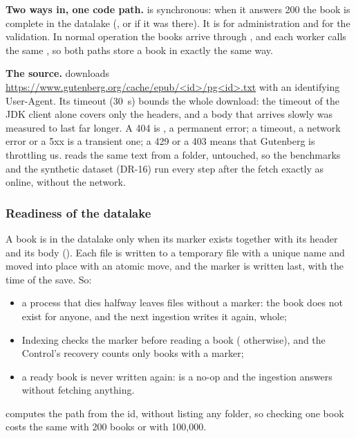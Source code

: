 \textbf{Two ways in, one code path.}  is synchronous: when it answers 200 the book is
complete in the datalake (, or  if it was there). It is for administration
and for the validation. In normal operation the books arrive through , and each worker calls the
same , so both paths store a book in exactly the same way.

\textbf{The source.}  downloads \url{https://www.gutenberg.org/cache/epub/<id>/pg<id>.txt}
with an identifying User-Agent. Its timeout (30~s) bounds the whole download: the timeout of the JDK client alone
covers only the headers, and a body that arrives slowly was measured to last far longer. A 404 is
, a permanent error; a timeout, a network error or a 5xx is a transient one; a 429 or a 403 means that
Gutenberg is throttling us.  reads the same text from a folder, untouched, so the benchmarks and
the synthetic dataset (DR-16) run every step after the fetch exactly as online, without the network.

\subsubsection{Readiness of the datalake}
\label{sec:readiness}

A book is in the datalake only when its  marker exists together with its header and its body
(). Each file is written to a temporary file with a unique name and moved
into place with an atomic move, and the marker is written last, with the time of the save. So:
\begin{itemize}
  \item a process that dies halfway leaves files without a marker: the book does not exist for anyone, and the next
    ingestion writes it again, whole;
  \item Indexing checks the marker before reading a book ( otherwise), and the Control's recovery
    counts only books with a marker;
  \item a ready book is never written again:  is a no-op and the ingestion answers 
    without fetching anything.
\end{itemize}
 computes the path from the id, without listing any folder, so checking one book costs the same with 200
books or with 100,000.

